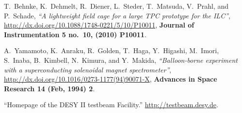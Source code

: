 \begin{thebibliography}{9}










T.~Behnke, K.~Dehmelt, R.~Diener, L.~Steder, T.~Matsuda, V.~Prahl, and
  P.~Schade, \textit{``A lightweight field cage for a large {TPC} prototype for the
  {ILC}''}, \url{http://dx.doi.org/10.1088/1748-0221/5/10/P10011}, {{\textbf {Journal
  of Instrumentation {\bfseries 5} no.~10, (2010) {P10011}}}}.


A.~Yamamoto, K.~Anraku, R.~Golden, T.~Haga, Y.~{Higashi}, M.~Imori, S.~Inaba,
  B.~Kimbell, N.~{Kimura}, and Y.~Makida, \textit{``{Balloon-borne experiment with a
  superconducting solenoidal magnet spectrometer}''},
  \url{http://dx.doi.org/10.1016/0273-1177(94)90071-X}, {{\textbf {Advances in Space
  Research {\bfseries 14} (Feb, 1994) 2}}}.  


``{Homepage of the DESY II testbeam Facility}.'' \url{http://testbeam.desy.de}.  







\end{thebibliography}

